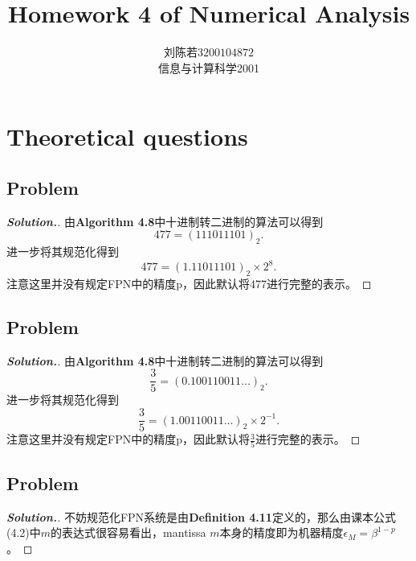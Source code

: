 \documentclass{ctexart}
\begin{document}
\begin{sloppypar}
\title{\vspace{-3cm} \textbf{Homework 4 of Numerical Analysis}}
\author{刘陈若\;$3200104872$\\信息与计算科学2001}
\date{}

\maketitle

\section*{Theoretical questions}
\subsection*{Problem \uppercase\expandafter{}}
\begin{proof}[\textbf{Solution.}]
由\textbf{Algorithm 4.8}中十进制转二进制的算法可以得到
\begin{equation}
    477 = (111011101)_2. 
\end{equation}
进一步将其规范化得到
\begin{equation}
    477= (1.11011101)_2 \times 2^8.
\end{equation}
注意这里并没有规定FPN中的精度p，因此默认将477进行完整的表示。
\end{proof}

\subsection*{Problem \uppercase\expandafter{}}
\begin{proof}[\textbf{Solution.}]
由\textbf{Algorithm 4.8}中十进制转二进制的算法可以得到
\begin{equation}
    \frac{3}{5} = (0.100110011\dots)_2. 
\end{equation}
进一步将其规范化得到
\begin{equation}
    \frac{3}{5}= (1.00110011\dots)_2 \times 2^{-1}.
\end{equation}
注意这里并没有规定FPN中的精度p，因此默认将$\frac{3}{5}$进行完整的表示。
\end{proof}

\subsection*{Problem \uppercase\expandafter{}}
\begin{proof}[\textbf{Solution.}]
不妨规范化FPN系统是由\textbf{Definition 4.11}定义的，那么由课本公式(4.2)中$m$的表达式很容易看出，mantissa $m$本身的精度即为机器精度$\epsilon_M = \beta^{1-p}$。


\end{proof}
\end{sloppypar}
\end{document}
